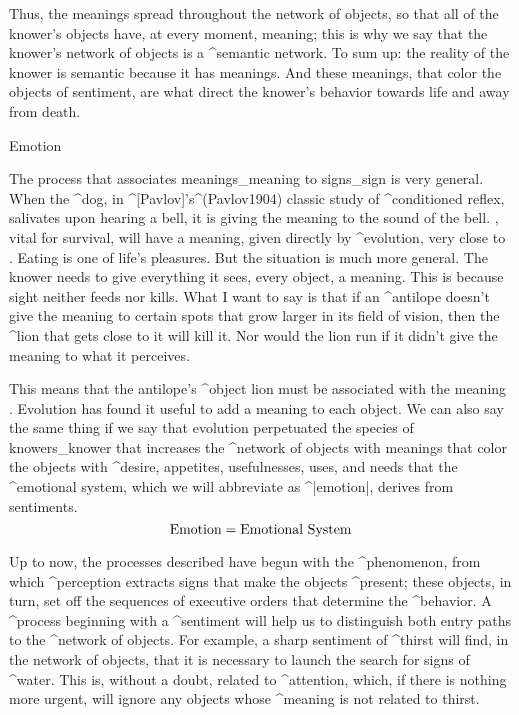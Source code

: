 Thus, the meanings spread throughout the network of objects, so that all
of the knower's objects have, at every moment, meaning; this is why we
say that the knower's network of objects is a ^{semantic network}. To
sum up: the reality of the knower is semantic because it has meanings.
And these meanings, that color the objects of sentiment, are what direct
the knower's behavior towards life and away from death.


\Section Emotion

The process that associates meanings_{meaning} to signs_{sign} is very
general. When the ^{dog}, in ^[Pavlov]'s^(Pavlov1904) classic study of
^{conditioned reflex}, salivates upon hearing a bell, it is giving the
meaning  to the sound of the bell. , vital
for survival, will have a meaning, given directly by ^{evolution}, very
close to . Eating is one of life's pleasures. But the
situation is much more general. The knower needs to give everything it
sees, every object, a meaning. This is because sight neither feeds nor
kills. What I want to say is that if an ^{antilope} doesn't give the
meaning  to certain spots that grow larger in
its field of vision, then the ^{lion} that gets close to it will kill
it. Nor would the lion run if it didn't give the meaning  to what it perceives.

This means that the antilope's ^{object} lion must be associated with
the meaning . Evolution has found it useful to add a
meaning to each object. We can also say the same thing if we say that
evolution perpetuated the species of knowers_{knower} that increases the
^{network of objects} with meanings that color the objects with
^{desire}, appetites, usefulnesses, uses, and needs that the ^{emotional
system}, which we will abbreviate as ^|emotion|, derives from
sentiments.
$$\hbox{Emotion} = \hbox{Emotional System}$$

Up to now, the processes described have begun with the ^{phenomenon},
from which ^{perception} extracts signs that make the objects
^{present}; these objects, in turn, set off the sequences of executive
orders that determine the ^{behavior}. A ^{process} beginning with a
^{sentiment} will help us to distinguish both entry paths to the
^{network of objects}. For example, a sharp sentiment of ^{thirst} will
find, in the network of objects, that it is necessary to launch the
search for signs of ^{water}. This is, without a doubt, related to
^{attention}, which, if there is nothing more urgent, will ignore any
objects whose ^{meaning} is not related to thirst.

